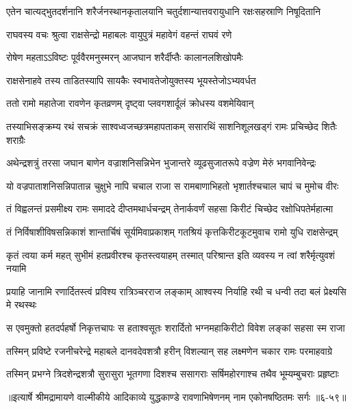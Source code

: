 \twolineshloka
{एतेन चात्यद्भुतदर्शनानि शरैर्जनस्थानकृतालयानि}
{चतुर्दशान्यात्तवरायुधानि रक्षःसहस्राणि निषूदितानि} %

\twolineshloka
{राघवस्य वचः श्रुत्वा राक्षसेन्द्रो महाबलः}
{वायुपुत्रं महावेगं वहन्तं राघवं रणे} %

\twolineshloka
{रोषेण महताऽऽविष्टः पूर्ववैरमनुस्मरन्}
{आजघान शरैर्दीप्तैः कालानलशिखोपमैः} %

\twolineshloka
{राक्षसेनाहवे तस्य ताडितस्यापि सायकैः}
{स्वभावतेजोयुक्तस्य भूयस्तेजोऽभ्यवर्धत} %

\twolineshloka
{ततो रामो महातेजा रावणेन कृतव्रणम्}
{दृष्ट्वा प्लवगशार्दूलं क्रोधस्य वशमेयिवान्} %

\twolineshloka
{तस्याभिसङ्क्रम्य रथं सचक्रं साश्वध्वजच्छत्रमहापताकम्}
{ससारथिं साशनिशूलखड्गं रामः प्रचिच्छेद शितैः शराग्रैः} %

\twolineshloka
{अथेन्द्रशत्रुं तरसा जघान बाणेन वज्राशनिसन्निभेन}
{भुजान्तरे व्यूढसुजातरूपे वज्रेण मेरुं भगवानिवेन्द्रः} %

\twolineshloka
{यो वज्रपाताशनिसन्निपातान्न चुक्षुभे नापि चचाल राजा}
{स रामबाणाभिहतो भृशार्तश्चचाल चापं च मुमोच वीरः} %

\twolineshloka
{तं विह्वलन्तं प्रसमीक्ष्य रामः समाददे दीप्तमथार्धचन्द्रम्}
{तेनार्कवर्णं सहसा किरीटं चिच्छेद रक्षोधिपतेर्महात्मा} %

\twolineshloka
{तं निर्विषाशीविषसन्निकाशं शान्तार्चिषं सूर्यमिवाप्रकाशम्}
{गतश्रियं कृत्तकिरीटकूटमुवाच रामो युधि राक्षसेन्द्रम्} %

\twolineshloka
{कृतं त्वया कर्म महत् सुभीमं हतप्रवीरश्च कृतस्त्वयाहम्}
{तस्मात् परिश्रान्त इति व्यवस्य न त्वां शरैर्मृत्युवशं नयामि} %

\twolineshloka
{प्रयाहि जानामि रणार्दितस्त्वं प्रविश्य रात्रिञ्चरराज लङ्काम्}
{आश्वस्य निर्याहि रथी च धन्वी तदा बलं प्रेक्ष्यसि मे रथस्थः} %

\twolineshloka
{स एवमुक्तो हतदर्पहर्षो निकृत्तचापः स हताश्वसूतः}
{शरार्दितो भग्नमहाकिरीटो विवेश लङ्कां सहसा स्म राजा} %

\twolineshloka
{तस्मिन् प्रविष्टे रजनीचरेन्द्रे महाबले दानवदेवशत्रौ}
{हरीन् विशल्यान् सह लक्ष्मणेन चकार रामः परमाहवाग्रे} %

\twolineshloka
{तस्मिन् प्रभग्ने त्रिदशेन्द्रशत्रौ सुरासुरा भूतगणा दिशश्च}
{ससागराः सर्षिमहोरगाश्च तथैव भूम्यम्बुचराः प्रहृष्टाः} %


॥इत्यार्षे श्रीमद्रामायणे वाल्मीकीये आदिकाव्ये युद्धकाण्डे रावणाभिषेणनम् नाम एकोनषष्ठितमः सर्गः ॥६-५९॥
